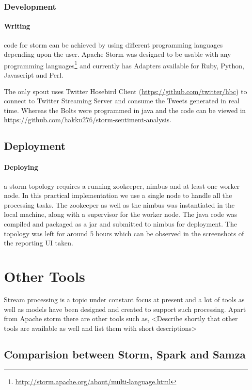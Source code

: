 \documentclass[runningheads,a4paper]{llncs}[2015/06/24]
\begin{document}
\subsubsection{Development}
\paragraph{Writing} code for storm can be achieved by using different programming languages depending upon the user. Apache Storm was designed to be usable with any programming languages\footnote{\url{http://storm.apache.org/about/multi-language.html}} and currently has Adapters available for Ruby, Python, Javascript and Perl.

The only spout uses Twitter Hosebird Client (\url{https://github.com/twitter/hbc}) to connect to Twitter Streaming Server and consume the Tweets generated in real time. Whereas the Bolts were programmed in java and the code can be viewed in \url{https://github.com/hakku276/storm-sentiment-analysis}.

\subsection{Deployment}
\paragraph{Deploying} a storm topology requires a running zookeeper, nimbus and at least one worker node. In this practical implementation we use a single node to handle all the processing tasks. The zookeeper as well as the nimbus was instantiated in the local machine, along with a supervisor for the worker node. The java code was compiled and packaged as a jar and submitted to nimbus for deployment. The topology was left for around 5 hours which can be observed in the screenshots of the reporting UI taken. 

\section{Other Tools}
 \label{sec:othertools}
 Stream processing is a topic under constant focus at present and a lot of tools as well as models have been designed and created to support such processing. Apart from Apache storm there are other tools such as, 
 <Describe shortly that other tools are available as well and list them with short descriptions>
 
 \subsection{Comparision between Storm, Spark and Samza}
 
\end{document}
